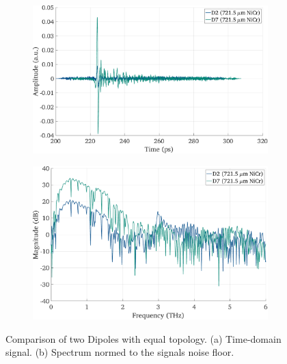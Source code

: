 \begin{figure}[h]
    \centering
    \begin{subfigure}[b]{0.485\textwidth}
        \centering
        \includegraphics[width=\textwidth]{figures/Results/D2_D7/D2_D7_time.pdf}
        \caption{}
    \end{subfigure}
    \hfill
    \begin{subfigure}[b]{0.485\textwidth}
        \centering
        \includegraphics[width=\textwidth]{figures/Results/D2_D7/D2_D7_spectrum_nn.pdf}
        \caption{}
    \end{subfigure}
    \caption{Comparison of two Dipoles with equal topology. (a) Time-domain signal. (b) Spectrum normed to the signals noise floor.}
\end{figure}